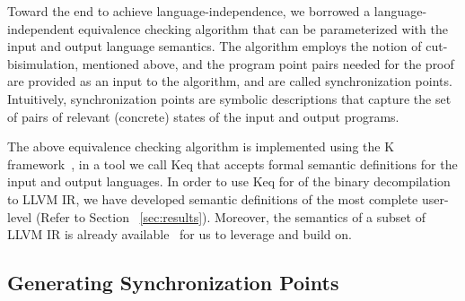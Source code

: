  Toward the end to achieve language-independence, we borrowed a
 language-independent equivalence checking algorithm that can be parameterized
 with the input and output language semantics. The algorithm employs the notion
 of cut-bisimulation, mentioned above, and the program point pairs needed for
 the proof are provided as an input to the algorithm, and are called
 synchronization points. Intuitively, synchronization points are symbolic
 descriptions that capture the set of pairs of relevant (concrete) states of
 the input and output programs.
 
 The above equivalence checking algorithm is implemented using the K
 framework~\cite{k-primer-2013-v32}, in a tool we call Keq that accepts formal
 semantic definitions for the input and output languages. In order to use Keq
 for \TV of the binary decompilation to LLVM IR, we have developed \K semantic
 definitions of the most complete user-level \ISA (Refer to Section
     ~\ref{sec:results}). Moreover, the semantics of a subset of LLVM IR is
 already available~\cite{LLVMSEMA} for us to leverage and build on. 
 
 \subsection{Generating Synchronization Points}
